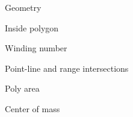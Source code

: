 \begin{algorithm}{Geometry}
\end{algorithm}

\begin{algorithm}{Inside polygon}
\end{algorithm}

\begin{algorithm}{Winding number}
\end{algorithm}

\begin{algorithm}{Point-line and range intersections}
\end{algorithm}

\begin{algorithm}{Poly area}
\end{algorithm}

\begin{algorithm}{Center of mass}
\end{algorithm}

